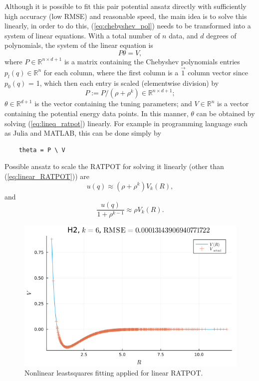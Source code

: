 \documentclass[12pt]{article}
\begin{document}
Although it is possible to fit this pair potential ansatz directly with sufficiently high accuracy (low RMSE) and reasonable speed, the main idea is to solve this linearly, in order to do this, (\ref{eq:chebyshev_pol}) needs to be transformed into a system of linear equations. With a total number of $n$ data, and $d$ degrees of polynomials, the system of the linear equation is
\begin{equation}
    P\theta = V,
    \label{eq:lineq_ratpot}
\end{equation}
where $P \in \mathbb{R}^{n \times d+1}$ is a matrix containing the Chebyshev polynomials entries $p_l(q) \in \mathbb{R}^n$ for each column, where the first column is a $\vec{1}$ column vector since $p_0(q)$ = 1, which then each entry is scaled (elementwise division) by 
\begin{equation}
    P := P / (\rho + \rho^k) \in \mathbb{R}^{n \times d+1};
\end{equation}
$\theta \in \mathbb{R}^{d+1}$ is the vector containing the tuning parameters; and $V \in \mathbb{R}^n$ is a vector containing the potential energy data points. In this manner, $\theta$ can be obtained by solving (\ref{eq:lineq_ratpot}) linearly. For example in programming language such as Julia and MATLAB, this can be done simply by
\begin{verbatim}
    theta = P \ V
\end{verbatim}

Possible ansatz to scale the RATPOT for solving it linearly (other than (\ref{eq:linear_RATPOT})) are
\begin{equation}
    u(q) \approx (\rho + \rho^k) V_k(R),
    \label{eq:linear_RATPOT_scale1}
\end{equation}
and
\begin{equation}
    \frac{u(q)}{1+\rho^{k-1}} \approx \rho V_k(R).
    \label{eq:linear_RATPOT_scale2}
\end{equation}

\begin{figure}[H]
    \centering
    \includegraphics[scale=0.7]{img/linear_RATPOT/linratpot_fit_H2_example.png}
    \caption{Nonlinear leastsquares fitting applied for linear RATPOT.}
    \label{fig:linratpot_fit}
\end{figure}
\end{document}
